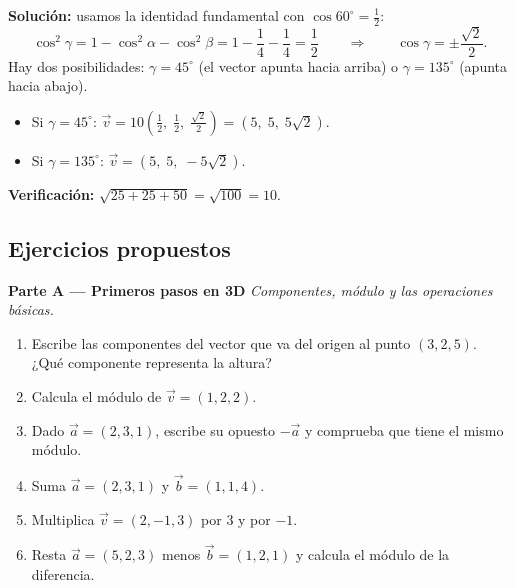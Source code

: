 \documentclass[12pt, letterpaper]{article}
\begin{document}
\begin{cuadrosolucion}
  \textbf{Solución:} usamos la identidad fundamental con $\cos 60^{\circ} = \tfrac{1}{2}$:
  $$\cos^2\gamma = 1 - \cos^2\alpha - \cos^2\beta = 1 - \frac{1}{4} - \frac{1}{4} = \frac{1}{2} \qquad \Longrightarrow \qquad \cos\gamma = \pm\frac{\sqrt{2}}{2}.$$
  Hay dos posibilidades: $\gamma = 45^{\circ}$ (el vector apunta hacia arriba) o $\gamma = 135^{\circ}$ (apunta hacia abajo).
  \begin{itemize}[leftmargin=*]
    \item Si $\gamma = 45^{\circ}$: $\vec{v} = 10\left(\tfrac{1}{2},\; \tfrac{1}{2},\; \tfrac{\sqrt{2}}{2}\right) = (5,\; 5,\; 5\sqrt{2})$.
    \item Si $\gamma = 135^{\circ}$: $\vec{v} = (5,\; 5,\; -5\sqrt{2})$.
  \end{itemize}
  \textbf{Verificación:} $\sqrt{25 + 25 + 50} = \sqrt{100} = 10$. \checkmark
\end{cuadrosolucion}

\subsection{Ejercicios propuestos}

\noindent\textbf{Parte A --- Primeros pasos en 3D \facil}\quad \emph{Componentes, módulo y las operaciones básicas.}

\begin{enumerate}[leftmargin=*, resume]
  \item \facil{} Escribe las componentes del vector que va del origen al punto $(3, 2, 5)$. ¿Qué componente representa la altura?

  \item \facil{} Calcula el módulo de $\vec{v} = (1, 2, 2)$.

  \item \facil{} Dado $\vec{a} = (2, 3, 1)$, escribe su opuesto $-\vec{a}$ y comprueba que tiene el mismo módulo.

  \item \facil{} Suma $\vec{a} = (2, 3, 1)$ y $\vec{b} = (1, 1, 4)$.

  \item \facil{} Multiplica $\vec{v} = (2, -1, 3)$ por $3$ y por $-1$.

  \item \facil{} Resta $\vec{a} = (5, 2, 3)$ menos $\vec{b} = (1, 2, 1)$ y calcula el módulo de la diferencia.
\end{enumerate}
\end{document}
